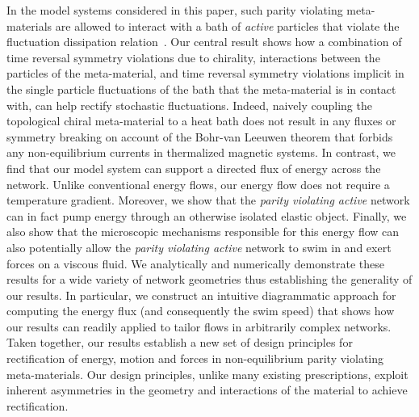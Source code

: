 \documentclass[
 preprint,
 preprintnumbers,
 amsmath,amssymb,
 aps,
 pre,
 longbibliography,
 superscriptaddress,
 10pt, twocolumn
]{revtex4-1}
\begin{document}
In the model systems considered in this paper, such parity violating meta-materials are allowed to interact with a bath of \textit{active} particles that violate the fluctuation dissipation relation~\cite{Fodor2016HowFar}. Our central result shows how a combination of time reversal symmetry violations due to chirality, interactions between the particles of the meta-material, and time reversal symmetry violations implicit in the single particle fluctuations of the bath that the meta-material is in contact with, can help rectify stochastic fluctuations. Indeed, naively coupling the topological chiral meta-material to a heat bath does not result in any fluxes or symmetry breaking on account of the Bohr-van Leeuwen theorem that forbids any non-equilibrium currents in thermalized magnetic systems. In contrast, we find that our model system can support a directed flux of energy across the network. Unlike conventional energy flows, our energy flow does not require a temperature gradient. Moreover, we show that the \textit{parity violating active} network can in fact pump energy through an otherwise isolated elastic object. Finally, we also show that the microscopic mechanisms responsible for this energy flow can also potentially allow the \textit{parity violating active} network to swim in and exert forces on a viscous fluid. We analytically and numerically demonstrate these results for a wide variety of network geometries thus establishing the generality of our results. In particular, we construct an intuitive diagrammatic approach for computing the energy flux (and consequently the swim speed) that shows how our results can readily applied to tailor flows in arbitrarily complex networks. Taken together, our results establish a new set of design principles for rectification of energy, motion and forces in non-equilibrium parity violating meta-materials. Our design principles, unlike many existing prescriptions, exploit inherent asymmetries in the geometry and interactions of the material to achieve rectification.





\end{document}
